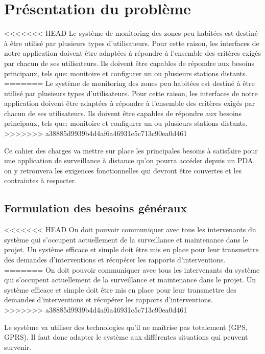 
\section{Présentation du problème}


<<<<<<< HEAD
Le système de monitoring des zones peu habitées est destiné à être utilisé par plusieurs types 
d'utilisateurs. Pour cette raison, les interfaces de notre application doivent être adaptées à 
répondre à l'ensemble des critères exigés par chacun de ses utilisateurs.
Ils doivent être capables de répondre aux besoins principaux, tels que: monitoire et configurer 
un ou plusieurs stations distants.\\
=======
Le système de monitoring des zones peu habitées est destiné à être utilisé par plusieurs types d'utilisateurs. Pour cette raison, les interfaces de notre application doivent être adaptées à répondre à l'ensemble des critères exigés par chacun de ses utilisateurs.
Ils doivent être capables de répondre aux besoins principaux, tels que: monitoire et configurer un ou plusieurs stations distants.\\
>>>>>>> a38885d9939b4d4af6a46931c5c713c90ea0d461

Ce cahier des charges va mettre sur place les principales besoins à satisfaire pour une application 
de surveillance à distance qu'on pourra accéder depuis un PDA, on y retrouvera les exigences 
fonctionnelles qui devront être couvertes et les contraintes à respecter.


\subsection{Formulation des besoins généraux}


<<<<<<< HEAD
On doit pouvoir communiquer avec tous les intervenants du système qui s'occupent actuellement de 
la surveillance et maintenance dans le projet. Un système efficace et simple doit être mis en place 
pour leur transmettre des demandes d'interventions et récupérer les rapports d'interventions.\\
=======
On doit pouvoir communiquer avec tous les intervenants du système qui s'occupent actuellement de la surveillance et maintenance dans le projet. Un système efficace et simple doit être mis en place pour leur transmettre des demandes d'interventions et récupérer les rapports d'interventions.\\
>>>>>>> a38885d9939b4d4af6a46931c5c713c90ea0d461

Le système va utiliser des technologies qu'il ne maîtrise pas totalement (GPS, GPRS). Il faut donc 
adapter le système aux différentes situations qui peuvent survenir.\\

